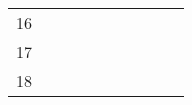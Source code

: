 \begin{table}[ht]
\begin{tabular}{c|lllllllll}
    16                                                                                                         &                                                                              &                                                          &                                                           &                                                                &                                                                  &                                                                                                                 &                                                                                                                &                                                                                                                                &                                                            \\
    17                                                                                                         &                                                                              &                                                          &                                                           &                                                                &                                                                  &                                                                                                                 &                                                                                                                &                                                                                                                                &                                                            \\
    18                                                                                                         &                                                                              &                                                          &                                                           &                                                                &                                                                  &                                                                                                                 &                                                                                                                &                                                                                                                                &                                                            \\

\end{tabular}
\end{table}

